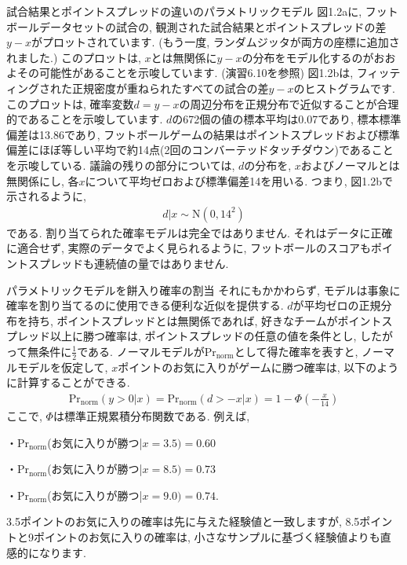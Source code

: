 \documentclass[10pt,dvipdfmx,a4]{beamer}
\newcommand{\eqn}[1]{\begin{align*}#1\end{align*}}
\begin{document}

\begin{frame}{試合結果とポイントスプレッドの違いのパラメトリックモデル}
図1.2aに, フットボールデータセットの試合の, 観測された試合結果とポイントスプレッドの差$y-x$がプロットされています.
(もう一度, ランダムジッタが両方の座標に追加されました.)
このプロットは, $x$とは無関係に$y-x$の分布をモデル化するのがおおよその可能性があることを示唆しています.
(演習6.10を参照)
図1.2bは, フィッティングされた正規密度が重ねられたすべての試合の差$y-x$のヒストグラムです.
このプロットは, 確率変数$d=y-x$の周辺分布を正規分布で近似することが合理的であることを示唆しています.
$d$の672個の値の標本平均は0.07であり, 標本標準偏差は13.86であり, フットボールゲームの結果はポイントスプレッドおよび標準偏差にほぼ等しい平均で約14点(2回のコンバーテッドタッチダウン)であることを示唆している.
議論の残りの部分については, $d$の分布を, $x$およびノーマルとは無関係にし, 各$x$について平均ゼロおよび標準偏差14を用いる.
つまり, 図1.2bで示されるように, 
\eqn{ d|x \sim \text{N}(0,14^2)}
である.
割り当てられた確率モデルは完全ではありません.
それはデータに正確に適合せず, 実際のデータでよく見られるように, フットボールのスコアもポイントスプレッドも連続値の量ではありません.
\end{frame}


\begin{frame}{パラメトリックモデルを餅入り確率の割当}
それにもかかわらず, モデルは事象に確率を割り当てるのに使用できる便利な近似を提供する.
$d$が平均ゼロの正規分布を持ち, ポイントスプレッドとは無関係であれば, 好きなチームがポイントスプレッド以上に勝つ確率は, ポイントスプレッドの任意の値を条件とし, したがって無条件に$\tfrac{1}{2}$である.
ノーマルモデルが$\text{Pr}_{\text{norm}}$として得た確率を表すと, ノーマルモデルを仮定して, $x$ポイントのお気に入りがゲームに勝つ確率は, 以下のように計算することができる.
\eqn{\text{Pr}_{\text{norm}}(y>0|x)=\text{Pr}_{\text{norm}}(d>-x|x)=1-\Phi\left(-\frac{x}{14}\right)}
ここで, $\Phi$は標準正規累積分布関数である.
例えば,

・$\text{Pr}_{\text{norm}}$(お気に入りが勝つ|$x=3.5)=0.60$

・$\text{Pr}_{\text{norm}}$(お気に入りが勝つ|$x=8.5)=0.73$

・$\text{Pr}_{\text{norm}}$(お気に入りが勝つ|$x=9.0)=0.74$.

3.5ポイントのお気に入りの確率は先に与えた経験値と一致しますが, 8.5ポイントと9ポイントのお気に入りの確率は, 小さなサンプルに基づく経験値よりも直感的になります.
\end{frame}
\end{document}
